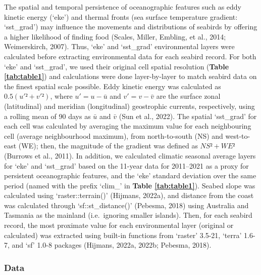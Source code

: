 \documentclass{article}
\begin{document}
The spatial and temporal persistence of oceanographic features such as eddy kinetic energy (`eke') and thermal fronts (sea surface temperature gradient: `sst\_grad') may influence the movements and distributions of seabirds by offering a higher likelihood of finding food (Scales, Miller, Embling, et al., 2014; Weimerskirch, 2007). Thus, `eke' and `sst\_grad' environmental layers were calculated before extracting environmental data for each seabird record. For both `eke' and `sst\_grad', we used their original cell spatial resolution (\textbf{Table \ref{tab:table1}}) and calculations were done layer-by-layer to match seabird data on the finest spatial scale possible. Eddy kinetic energy was calculated as \(0.5 (u'² + v'²)\), where \(u' = u - \bar{u}\) and \(v' = v - \bar{v}\) are the surface zonal (latitudinal) and meridian (longitudinal) geostrophic currents, respectively, using a rolling mean of 90 days as \(\bar{u}\) and \(\bar{v}\) (Sun et al., 2022). The spatial `sst\_grad' for each cell was calculated by averaging the maximum value for each neighbouring cell (average neighbourhood maximum), from north-to-south (NS) and west-to-east (WE); then, the magnitude of the gradient was defined as \(NS² + WE²\) (Burrows et al., 2011). In addition, we calculated climatic seasonal average layers for `eke' and `sst\_grad' based on the 11-year data for 2011--2021 as a proxy for persistent oceanographic features, and the `eke' standard deviation over the same period (named with the prefix `clim\_' in \textbf{Table \ref{tab:table1}}). Seabed slope was calculated using `raster::terrain()' (Hijmans, 2022a), and distance from the coast was calculated through `sf::st\_distance()' (Pebesma, 2018) using Australia and Tasmania as the mainland (i.e.~ignoring smaller islands). Then, for each seabird record, the most proximate value for each environmental layer (original or calculated) was extracted using built-in functions from `raster' 3.5-21, `terra' 1.6-7, and `sf' 1.0-8 packages (Hijmans, 2022a, 2022b; Pebesma, 2018).

\hypertarget{modellingdatasets}{%
\subsubsection{Data}\label{modellingdatasets}}

\label{sec:modellingdatasets}
\end{document}

